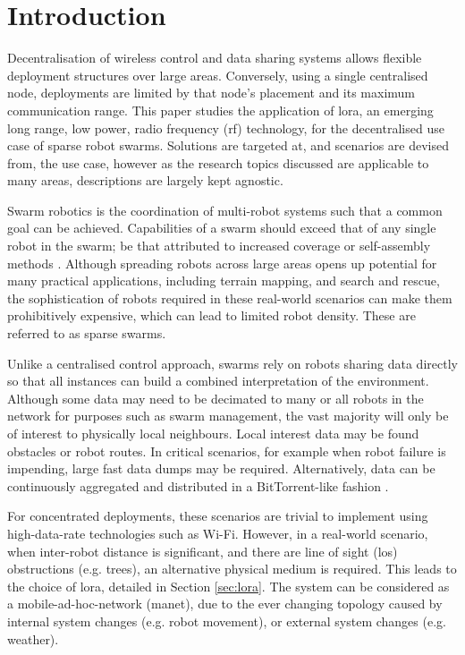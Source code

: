 \chapter{Introduction}
Decentralisation of wireless control and data sharing systems allows flexible deployment structures over large areas. Conversely, using a single centralised node, deployments are limited by that node's placement and its maximum communication range. This paper studies the application of \ac{lora}, an emerging long range, low power, radio frequency (\ac{rf}) technology, for the decentralised use case of sparse robot swarms. Solutions are targeted at, and scenarios are devised from, the use case, however as the research topics discussed are applicable to many areas, descriptions are largely kept agnostic. 
  
Swarm robotics is the coordination of multi-robot systems such that a common goal can be achieved. Capabilities of a swarm should exceed that of any single robot in the swarm; be that attributed to increased coverage \cite{Ducatelle:2011:Pathfinding} or self-assembly methods \cite{3YP:OBSTACLE_SWARMS}. Although spreading robots across large areas opens up potential for many practical applications, including terrain mapping, and search and rescue, the sophistication of robots required in these real-world scenarios can make them prohibitively expensive, which can lead to limited robot density. These are referred to as sparse swarms.
 
Unlike a centralised control approach, swarms rely on robots sharing data directly so that all instances can build a combined interpretation of the environment. Although some data may need to be decimated to many or all robots in the network for purposes such as swarm management, the vast majority will only be of interest to physically local neighbours. Local interest data may be found obstacles or robot routes. In critical scenarios, for example when robot failure is impending, large fast data dumps may be required. Alternatively, data can be continuously aggregated and distributed in a BitTorrent-like fashion \cite{3YP:SOUL}.

For concentrated deployments, these scenarios are trivial to implement using high-data-rate technologies such as Wi-Fi. However, in a real-world scenario, when inter-robot distance is significant, and there are line of sight (\ac{los}) obstructions (e.g. trees), an alternative physical medium is required. This leads to the choice of \ac{lora}, detailed in Section \ref{sec:lora}. The system can be considered as a mobile-ad-hoc-network (\ac{manet}), due to the ever changing topology caused by internal system changes (e.g. robot movement), or external system changes (e.g. weather).


